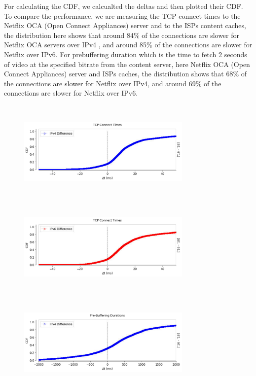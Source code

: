 For calculating the CDF, we calcualted the deltas and then plotted their CDF. To compare the performance, 
we are measuring the TCP connect times to the Netflix OCA (Open Connect Appliances) server and to the ISPs content caches, 
the distribution here shows that around 84\% of the connections are slower for Netflix OCA servers over IPv4 , and around 85\% of the connections are slower for Netflix over IPv6. 
For prebuffering duration which is the time to fetch 2 seconds of video at the specified bitrate from the content server, here Netflix OCA (Open Connect Appliances) server and ISPs caches,
the distribution shows that 68\% of the connections are slower for Netflix over IPv4, and around 69\% of the connections are slower for Netflix over IPv6.

\begin{figure}
	\centering
	\begin{minipage}{0.5\textwidth}
		\centering
		\includegraphics[keepaspectratio, height=5cm, width=8.5cm]{figures/cache/allisps/netflix-syn-diff-all-isps-cdf-v4.pdf}
	\end{minipage}
	\begin{minipage}{0.5\textwidth}
		\centering
		\includegraphics[keepaspectratio, height=5cm, width=8.5cm]{figures/cache/allisps/netflix-syn-diff-all-isps-cdf-v6.pdf}
	\end{minipage}
	\begin{minipage}{0.5\textwidth}
		\centering
		\includegraphics[keepaspectratio, height=5cm, width=8.5cm]{figures/cache/allisps/netflix-pd-diff-all-isps-cdf-v4.pdf}

\end{minipage}
\end{figure}
